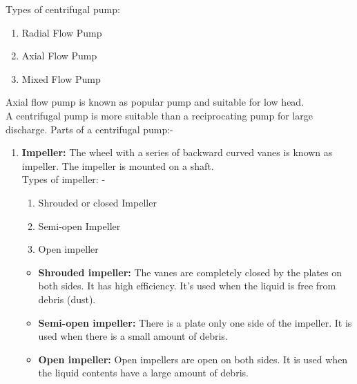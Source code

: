 \documentclass{article}
\begin{document}
\begin{multicols}{2}
  Types of centrifugal pump:
  \begin{enumerate}
    \item Radial Flow Pump
    \item Axial Flow Pump 
    \item Mixed Flow Pump 
  \end{enumerate}

  Axial flow pump is known as popular pump and suitable for low head. \\
  A centrifugal pump is more suitable than a reciprocating pump for large discharge. Parts of a centrifugal pump:- 

  \begin{enumerate}
    \item \textbf{Impeller:} The wheel with a series of backward curved vanes is known as impeller. The impeller is mounted on a shaft.\\
    Types of impeller: -
    \begin{enumerate}
      \item Shrouded or closed Impeller 
      \item Semi-open Impeller
      \item Open impeller 
    \end{enumerate}
    \begin{itemize}
      \item \textbf{Shrouded impeller:} The vanes are completely closed by the plates on both sides. It has high efficiency. It's used when the liquid is free from debris (dust).
      \item \textbf{Semi-open impeller:} There is a plate only one side of the impeller. It is used when there is a small amount of debris. 
      \item \textbf{Open impeller:} Open impellers are open on both sides. It is used when the liquid contents have a large amount of debris.  
    \end{itemize}


\end{enumerate}
\end{multicols}
\end{document}
